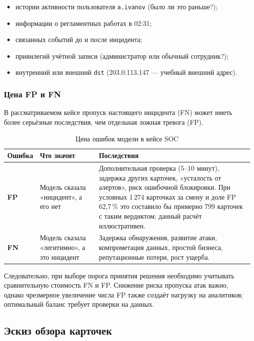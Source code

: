 \documentclass[12pt]{extreport}
\begin{document}
	\begin{itemize}
		\item истории активности пользователя \texttt{a.ivanov} (было ли это раньше?);
		\item информации о регламентных работах в 02:31;
		\item связанных событий до и после инцидента;
		\item привилегий учётной записи (администратор или обычный сотрудник?);
		\item внутренний или внешний \texttt{dst} (203.0.113.147 --- учебный внешний адрес).
	\end{itemize}
	
	\subsubsection{Цена FP и FN}
	
	В рассматриваемом кейсе пропуск настоящего инцидента (FN) может иметь более серьёзные последствия, чем отдельная ложная тревога (FP).
	
	\begin{table}[H]
		\centering
		\caption{Цена ошибок модели в кейсе SOC}
		\begin{tabular}{@{}p{2.5cm}p{4.5cm}p{6.5cm}@{}}
			\toprule
			Ошибка & Что значит & Последствия \\
			\midrule
			\textbf{FP} & Модель сказала «инцидент», а его нет & Дополнительная проверка (5--10 минут), задержка других карточек, «усталость от алертов», риск ошибочной блокировки. При условных 1\,274 карточках за смену и доле FP 62,7\,\% это составило бы примерно 799 карточек с таким вердиктом; данный расчёт иллюстративен. \\
			\textbf{FN} & Модель сказала «легитимно», а это инцидент & Задержка обнаружения, развитие атаки, компрометация данных, простой бизнеса, репутационные потери, рост ущерба. \\
			\bottomrule
		\end{tabular}
	\end{table}
	
	Следовательно, при выборе порога принятия решения необходимо учитывать сравнительную стоимость FN и FP. Снижение риска пропуска атак важно, однако чрезмерное увеличение числа FP также создаёт нагрузку на аналитиков; оптимальный баланс требует проверки на данных.
	
	\subsection{Эскиз обзора карточек}
	
\end{document}
